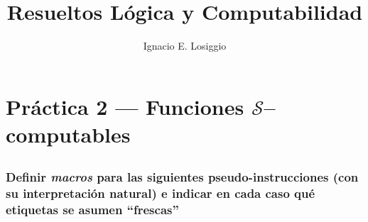 \documentclass[fleqn, 11pt]{article}
\title{Resueltos Lógica y Computabilidad}
\author{Ignacio E. Losiggio}
\newcommand{\Scur}{\mathcal{S}}
\begin{document}
\maketitle
\section{Práctica 2 --- Funciones $\Scur$--computables}

\subsection{}

\subsubsection{Definir \emph{macros} para las siguientes pseudo-instrucciones
(con su interpretación natural) e indicar en cada caso qué etiquetas se asumen
``frescas''}
\end{document}

